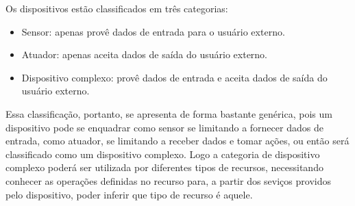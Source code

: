Os dispositivos estão classificados em três categorias:
\begin{itemize}
	\item Sensor: apenas provê dados de entrada para o usuário externo.
	\item Atuador: apenas aceita dados de saída do usuário externo.
	\item Dispositivo complexo: provê dados de entrada e aceita dados de saída do usuário externo.
\end{itemize}

Essa classificação, portanto, se apresenta de forma bastante genérica, pois um dispositivo pode se enquadrar como sensor se limitando a fornecer dados de entrada, como atuador, se limitando a receber dados e tomar ações, ou então será classificado como um dispositivo complexo. Logo a categoria de dispositivo complexo poderá ser utilizada por diferentes tipos de recursos, necessitando conhecer as operações definidas no recurso para, a partir dos seviços providos pelo dispositivo, poder inferir que tipo de recurso é aquele. 
